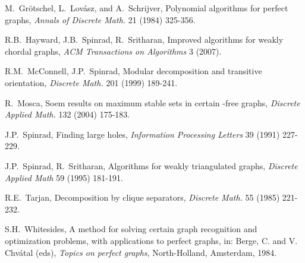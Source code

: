 \documentclass[11pt]{article}
\newcommand{\0}{\text{ has a co-join to }}
\newcommand{\1}{\text{ has a join to }}
\begin{document}
\begin{footnotesize}
\begin{thebibliography}{99}
    M.~Gr\"otschel, L.~Lov\'asz, and A.~Schrijver,
    Polynomial algorithms for perfect graphs,
    {\sl Annals of Discrete Math.} 21 (1984) 325-356.
 
    R.B.~Hayward, J.B.~Spinrad, R.~Sritharan,
    Improved algorithms for weakly chordal graphs,
    {\sl ACM Transactions on Algorithms} 3 (2007).

    R.M.~McConnell, J.P.~Spinrad,
    Modular decomposition and transitive orientation,
    {\sl Discrete Math.} 201 (1999) 189-241.

    R.~Mosca, 
    Soem results on maximum stable sets in certain -free graphs,
    {\sl Discrete Applied Math.} 132 (2004) 175-183.


    J.P.~Spinrad,
    Finding large holes,
    {\sl Information Processing Letters} 39 (1991) 227-229.

    J.P.~Spinrad, R.~Sritharan,
    Algorithms for weakly triangulated graphs,
    {\sl Discrete Applied Math} 59 (1995) 181-191.

    R.E.~Tarjan,
    Decomposition by clique separators,
    {\sl Discrete Math.} 55 (1985) 221-232.

    S.H.~Whitesides,
    A method for solving certain graph recognition and optimization
    problems, with applications to perfect graphs, in: Berge, C.
    and V. Chv\'atal (eds),
    {\sl Topics on perfect graphs},
    North-Holland, Amsterdam, 1984.

\end{thebibliography}

\end{footnotesize}
\end{document}

